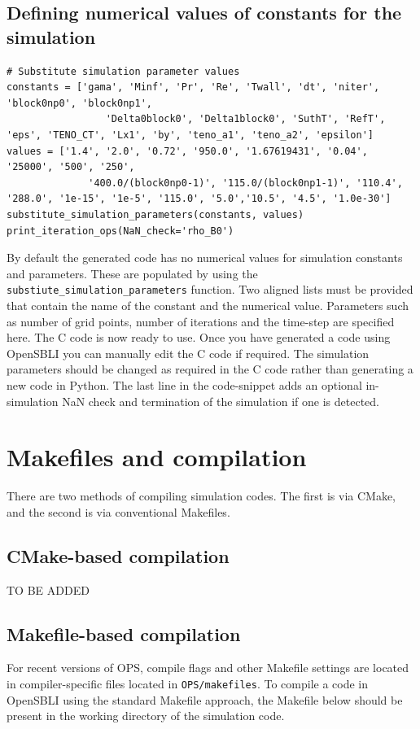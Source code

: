\documentclass[11pt]{article}
\begin{document}
\subsection{Defining numerical values of constants for the simulation}
\begin{lstlisting}
# Substitute simulation parameter values
constants = ['gama', 'Minf', 'Pr', 'Re', 'Twall', 'dt', 'niter', 'block0np0', 'block0np1',
                 'Delta0block0', 'Delta1block0', 'SuthT', 'RefT', 'eps', 'TENO_CT', 'Lx1', 'by', 'teno_a1', 'teno_a2', 'epsilon']
values = ['1.4', '2.0', '0.72', '950.0', '1.67619431', '0.04', '25000', '500', '250',
              '400.0/(block0np0-1)', '115.0/(block0np1-1)', '110.4', '288.0', '1e-15', '1e-5', '115.0', '5.0','10.5', '4.5', '1.0e-30']
substitute_simulation_parameters(constants, values)
print_iteration_ops(NaN_check='rho_B0')
\end{lstlisting}
By default the generated code has no numerical values for simulation constants and parameters. These are populated by using the \verb|substiute_simulation_parameters| function. Two aligned lists must be provided that contain the name of the constant and the numerical value. Parameters such as number of grid points, number of iterations and the time-step are specified here. The C code is now ready to use. Once you have generated a code using OpenSBLI you can manually edit the C code if required. The simulation parameters should be changed as required in the C code rather than generating a new code in Python. The last line in the code-snippet adds an optional in-simulation NaN check and termination of the simulation if one is detected.


\newpage

\newpage
\section{Makefiles and compilation}\label{sec:makefiles}
There are two methods of compiling simulation codes. The first is via CMake, and the second is via conventional Makefiles.

\subsection{CMake-based compilation}
TO BE ADDED

\subsection{Makefile-based compilation}
For recent versions of OPS, compile flags and other Makefile settings are located in compiler-specific files located in \verb|OPS/makefiles|. To compile a code in OpenSBLI using the standard Makefile approach, the Makefile below should be present in the working directory of the simulation code.
\end{document}
